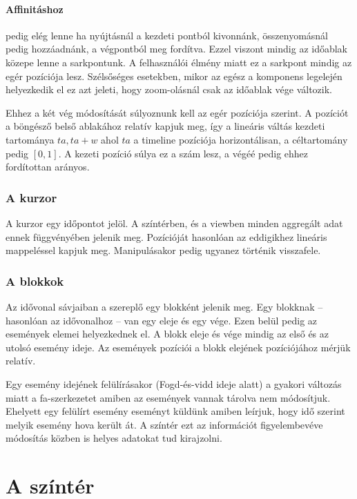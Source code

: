 \paragraph{Affinitáshoz} pedig elég lenne ha nyújtásnál a kezdeti pontból kivonnánk, összenyomásnál pedig hozzáadnánk, a végpontból meg fordítva. Ezzel viszont mindig az időablak közepe lenne a sarkpontunk. A felhasználói élmény miatt ez a sarkpont mindig az egér pozíciója lesz. Szélsőséges esetekben, mikor az egész a komponens legelején helyezkedik el ez azt jeleti, hogy zoom-olásnál csak az időablak vége változik.

Ehhez a két vég módosítását súlyoznunk kell az egér pozíciója szerint. A pozíciót a böngésző belső ablakához relatív kapjuk meg, így a lineáris váltás kezdeti tartománya ${ta, ta + w}$ ahol $ta$ a timeline pozíciója horizontálisan, a céltartomány pedig $[0, 1]$. A kezeti pozíció súlya ez a szám lesz, a végéé pedig ehhez fordítottan arányos.

\subsubsection{A kurzor}

A kurzor egy időpontot jelöl. A színtérben, és a viewben minden aggregált adat ennek függvényében jelenik meg. Pozícióját hasonlóan az eddigikhez lineáris mappeléssel kapjuk meg. Manipulásakor pedig ugyanez történik visszafele.

\subsubsection{A blokkok}

Az idővonal sávjaiban a szereplő egy blokként jelenik meg. Egy blokknak -- hasonlóan az idővonalhoz -- van egy eleje és egy vége. Ezen belül pedig az események elemei helyezkednek el. A blokk eleje és vége mindig az első és az utolsó esemény ideje. Az események pozíciói a blokk elejének pozíciójához mérjük relatív.

Egy esemény idejének felülírásakor (Fogd-és-vidd ideje alatt) a gyakori változás miatt a fa-szerkezetet amiben az események vannak tárolva nem módosítjuk. Ehelyett egy felülírt esemény eseményt küldünk amiben leírjuk, hogy idő szerint melyik esemény hova került át. A színtér ezt az információt figyelembevéve módosítás közben is helyes adatokat tud kirajzolni.

\section{A színtér}

